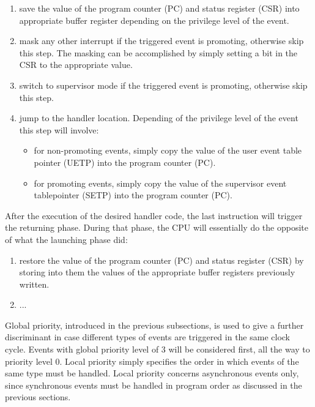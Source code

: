 \documentclass{article}
\begin{document}
            \begin{enumerate}

                \item save the value of the program counter (PC) and status register (CSR) into appropriate buffer register depending on the privilege level of the event.
                \item mask any other interrupt if the triggered event is promoting, otherwise skip this step. The masking can be accomplished by simply setting a bit in the CSR to the appropriate value.
                \item switch to supervisor mode if the triggered event is promoting, otherwise skip this step.
                \item jump to the handler location. Depending of the privilege level of the event this step will involve:

                    \begin{itemize}

                        \item for non-promoting events, simply copy the value of the user event table pointer (UETP) into the program counter (PC).
                        \item for promoting events, simply copy the value of the supervisor event tablepointer (SETP) into the program counter (PC).

                    \end{itemize}

            \end{enumerate}

            After the execution of the desired handler code, the last instruction will trigger the returning phase. During that phase, the CPU will essentially do the opposite of what the launching phase did:

            \begin{enumerate}

                \item restore the value of the program counter (PC) and status register (CSR) by storing into them the values of the appropriate buffer registers previously written.
                \item ...

            \end{enumerate}

            Global priority, introduced in the previous subsections, is used to give a further discriminant in case different types of events are triggered in the same clock cycle. Events with global priority level of 3 will be considered first, all the way to priority level 0. Local priority simply specifies the order in which events of the same type must be handled. Local priority concerns asynchronous events only, since synchronous events must be handled in program order as discussed in the previous sections.
\end{document}
